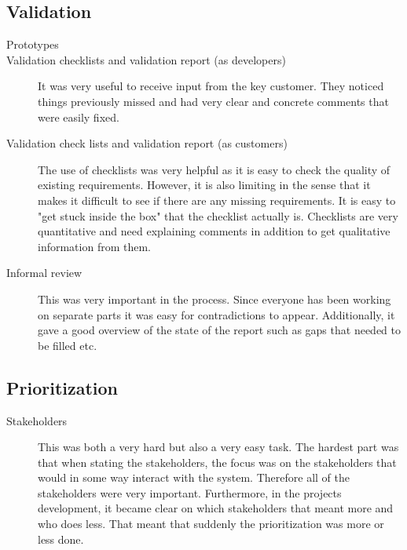 \documentclass[10pt,a4paper]{article}
\begin{document}
\subsection{Validation}
\begin{description}
\item[Prototypes]

\item[Validation checklists and validation report (as developers)] It was very useful to receive input from the key customer. They noticed things previously missed and had very clear and concrete comments that were easily fixed. 


\item[Validation check lists and validation report (as customers)] The use of checklists was very helpful as it is easy to check the quality of existing requirements. However, it is also limiting in the sense that it makes it difficult to see if there are any missing requirements. It is easy to "get stuck inside the box" that the checklist actually is. Checklists are very quantitative and need explaining comments in addition to get qualitative information from them.

\item[Informal review] This was very important in the process. Since everyone has been working on separate parts it was easy for contradictions to appear. Additionally, it gave a good overview of the state of the report such as gaps that needed to be filled etc.


\end{description}

\subsection{Prioritization}
\begin{description}
\item[Stakeholders] This was both a very hard but also a very easy task. The hardest part was that when stating the stakeholders, the focus was on the stakeholders that would in some way interact with the system. Therefore all of the stakeholders were very important. Furthermore, in the projects development, it became clear on which stakeholders that meant more and who does less. That meant that suddenly the prioritization was more or less done.
\end{description}

\end{document}
